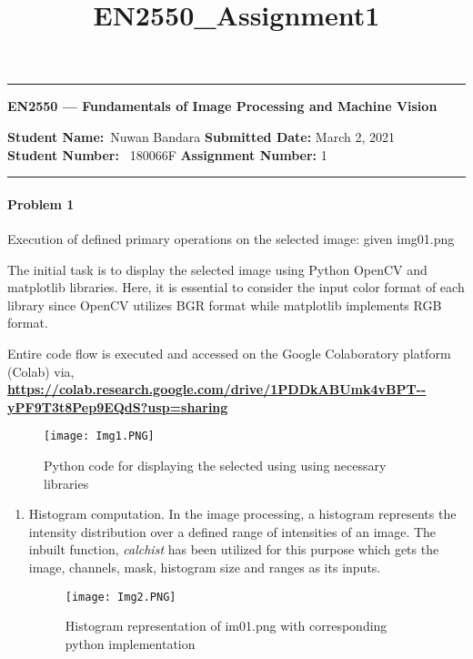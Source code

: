 \documentclass[11pt]{scrartcl}
\title{EN2550_Assignment1}
\begin{document}
\begin{center}
	\hrule
	\vspace{.4cm}
	{\textbf { \large EN2550 --- Fundamentals of Image Processing and Machine Vision}}
\end{center}
{\textbf{Student Name:}\ Nuwan Bandara \hspace{\fill} \textbf{Submitted Date:} March 2, 2021   \\
{ \textbf{Student Number:}} \ 180066F \hspace{\fill} \textbf{Assignment Number:} 1 \\
	\hrule


\paragraph*{Problem 1} %
Execution of defined primary operations on the selected image: given img01.png  

\bigskip

The initial task is to display the selected image using Python OpenCV and matplotlib libraries. Here, it is essential to consider the input color format of each library since OpenCV utilizes BGR format while matplotlib implements RGB format.

Entire code flow is executed and accessed on the Google Colaboratory platform (Colab) via, \\ 
\textbf{\url{https://colab.research.google.com/drive/1PDDkABUmk4vBPT--yPF9T3t8Pep9EQdS?usp=sharing}}

\begin{figure}[h!]
    \centering
    \texttt{[image: Img1.PNG]}
    \caption{Python code for displaying the selected using using necessary libraries}
    \label{fig: PaleBlueDot}    
\end{figure}
\begin{enumerate}[label=(\alph*)]
\item Histogram computation. \newline
In the image processing, a histogram represents the intensity distribution over a defined range of intensities of an image. The inbuilt function, \textit{calchist} has been utilized for this purpose which gets the image, channels, mask, histogram size and ranges as its inputs.

\begin{figure}[h!]
    \centering
    \texttt{[image: Img2.PNG]}
    \caption{Histogram representation of im01.png with corresponding python implementation}
    \label{fig: PaleBlueDot}    
\end{figure}


\end{enumerate}}
\end{document}

